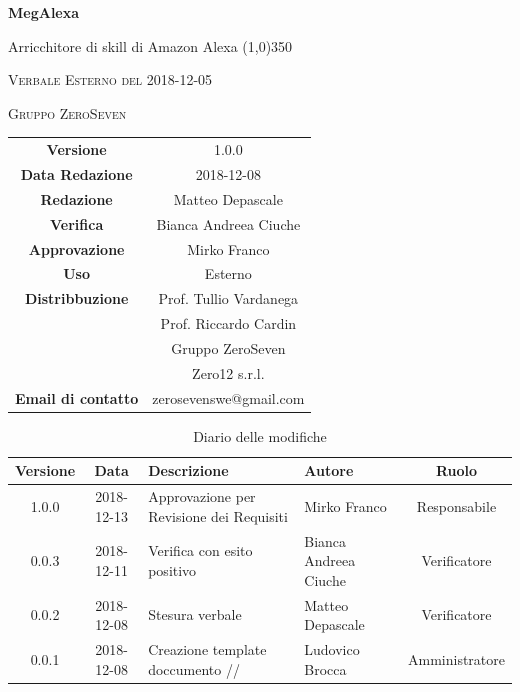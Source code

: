 \documentclass[a4paper,12pt]{article}
\author{Matteo Depascale}
\date{2018-12-08}
\begin{document}
\begin{titlepage}
	\centering
	{\huge\bfseries MegAlexa\par}
	Arricchitore di skill di Amazon Alexa
	\line(1,0){350} \\
	{\scshape\LARGE Verbale Esterno del 2018-12-05 \par}
	\vspace{1cm}
	{\scshape Gruppo ZeroSeven \par}
	\logo
	\begin{tabular}{c|c}
		{\hfill \textbf{Versione}} 			& 1.0.0				\\
		{\hfill\textbf{Data Redazione}} 	& 2018-12-08		\\ 
		{\hfill\textbf{Redazione}} 			&  		Matteo Depascale			\\ 
		{\hfill\textbf{Verifica}} 				&  		Bianca Andreea Ciuche		\\ 
		{\hfill\textbf{Approvazione}} 		&  		Mirko Franco	\\ 
		{\hfill\textbf{Uso}} 					& 	Esterno	\\ 
		{\hfill\textbf{Distribbuzione}} 			& 			Prof. Tullio Vardanega \\ & Prof. Riccardo Cardin \\ & Gruppo ZeroSeven \\ & Zero12 s.r.l.	\\ %
		{\hfill\textbf{Email di contatto}} & zerosevenswe@gmail.com \\
	\end{tabular}
\end{titlepage}
	

	
	\label{LastFrontPage}
	

	\newpage
	\cleardoublepage
		\begin{table}[tbph]
		\centering
		\begin{tabularx}{\textwidth}{|c|c|X|X|c|}
			\hline
			\textbf{Versione} & \textbf{Data} & \textbf{Descrizione} & \textbf{Autore} & \textbf{Ruolo} \\
			\hline
			1.0.0 & 2018-12-13 & Approvazione per Revisione dei Requisiti & Mirko Franco & Responsabile \\
			\hline
			0.0.3 & 2018-12-11 & Verifica con esito positivo & Bianca Andreea Ciuche & Verificatore \\
			\hline
			0.0.2 & 2018-12-08 & Stesura verbale & Matteo Depascale & Verificatore \\
			\hline
			0.0.1 & 2018-12-08 & Creazione template doccumento //%
			& Ludovico Brocca & Amministratore\\
			\hline
		\end{tabularx}
		\caption{Diario delle modifiche}
	\end{table}
	
\end{document}
